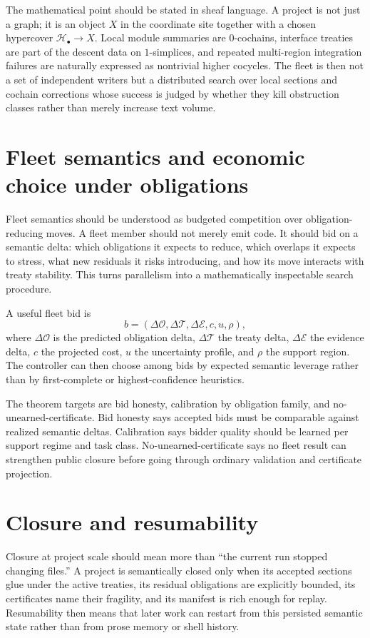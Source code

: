\documentclass[11pt]{report}
\begin{document}
The mathematical point should be stated in sheaf language. A project is not just a graph; it is an object $X$ in the coordinate site together with a chosen hypercover $\mathcal{H}_\bullet \to X$. Local module summaries are $0$-cochains, interface treaties are part of the descent data on $1$-simplices, and repeated multi-region integration failures are naturally expressed as nontrivial higher cocycles. The fleet is then not a set of independent writers but a distributed search over local sections and cochain corrections whose success is judged by whether they kill obstruction classes rather than merely increase text volume.
\section{Fleet semantics and economic choice under obligations}
Fleet semantics should be understood as budgeted competition over obligation-reducing moves. A fleet member should not merely emit code. It should bid on a semantic delta: which obligations it expects to reduce, which overlaps it expects to stress, what new residuals it risks introducing, and how its move interacts with treaty stability. This turns parallelism into a mathematically inspectable search procedure.

A useful fleet bid is
\[
b = (\Delta \mathcal{O}, \Delta \mathcal{T}, \Delta \mathcal{E}, c, u, \rho),
\]
where $\Delta \mathcal{O}$ is the predicted obligation delta, $\Delta \mathcal{T}$ the treaty delta, $\Delta \mathcal{E}$ the evidence delta, $c$ the projected cost, $u$ the uncertainty profile, and $\rho$ the support region. The controller can then choose among bids by expected semantic leverage rather than by first-complete or highest-confidence heuristics.

The theorem targets are bid honesty, calibration by obligation family, and no-unearned-certificate. Bid honesty says accepted bids must be comparable against realized semantic deltas. Calibration says bidder quality should be learned per support regime and task class. No-unearned-certificate says no fleet result can strengthen public closure before going through ordinary validation and certificate projection.
\section{Closure and resumability}
Closure at project scale should mean more than ``the current run stopped changing files.'' A project is semantically closed only when its accepted sections glue under the active treaties, its residual obligations are explicitly bounded, its certificates name their fragility, and its manifest is rich enough for replay. Resumability then means that later work can restart from this persisted semantic state rather than from prose memory or shell history.
\end{document}
